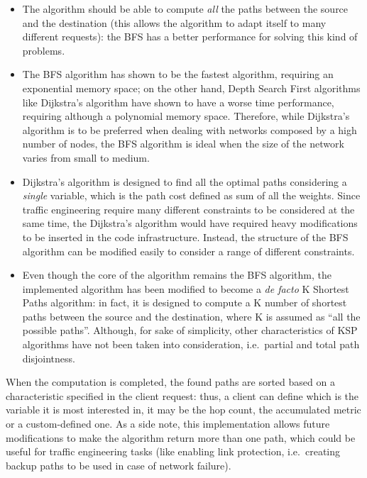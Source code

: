 \documentclass[10pt,a4paper]{report}
\begin{document}
\begin{itemize}
\item The algorithm should be able to compute \textit{all} the paths
  between the source and the destination (this allows the algorithm to
  adapt itself to many different requests): the BFS has a better
  performance for solving this kind of problems.
\item The BFS algorithm has shown to be the fastest algorithm,
  requiring an exponential memory space; on the other hand, Depth
  Search First algorithms like Dijkstra's algorithm have shown to have
  a worse time performance, requiring although a polynomial memory
  space. Therefore, while Dijkstra's algorithm is to be preferred when
  dealing with networks composed by a high number of nodes, the BFS
  algorithm is ideal when the size of the network varies from small to
  medium.
\item Dijkstra's algorithm is designed to find all the optimal paths
  considering a \textit{single} variable, which is the path cost
  defined as sum of all the weights. Since traffic engineering require
  many different constraints to be considered at the same time, the
  Dijkstra's algorithm would have required heavy modifications to be
  inserted in the code infrastructure. Instead, the structure of the
  BFS algorithm can be modified easily to consider a range of
  different constraints.
\item Even though the core of the algorithm remains the BFS algorithm,
  the implemented algorithm has been modified to become a \textit{de
    facto} K Shortest Paths algorithm: in fact, it is designed to
  compute a K number of shortest paths between the source and the
  destination, where K is assumed as ``all the possible
  paths''. Although, for sake of simplicity, other characteristics of
  KSP algorithms have not been taken into consideration, i.e.\ partial
  and total path disjointness.
\end{itemize}

When the computation is completed, the found paths are sorted based on
a characteristic specified in the client request: thus, a client can
define which is the variable it is most interested in, it may be the
hop count, the accumulated metric or a custom-defined one. As a side
note, this implementation allows future modifications to make the
algorithm return more than one path, which could be useful for traffic
engineering tasks (like enabling link protection, i.e.\ creating
backup paths to be used in case of network failure).
\end{document}
